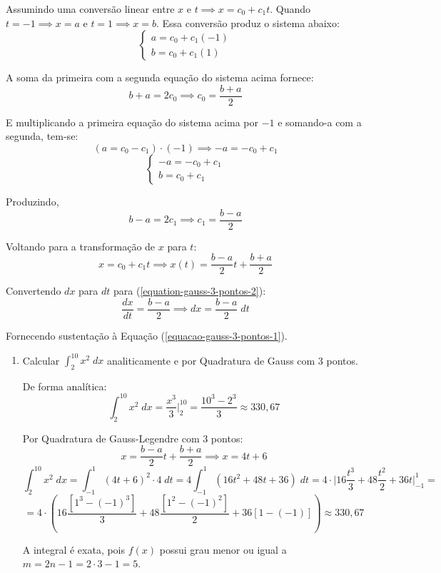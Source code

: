 Assumindo uma conversão linear entre $x$ e $t \implies x=c_0+c_1t$. Quando $t=-1\implies x=a$ e $t=1\implies x=b$. Essa conversão produz o sistema abaixo:
\[
\begin{cases}
	a=c_0+c_1(-1) \\
	b=c_0+c_1(1)
\end{cases}
\]

A soma da primeira com a segunda equação do sistema acima fornece:
\[ b+a=2c_0 \implies c_0=\frac{b+a}{2} \]

E multiplicando a primeira equação do sistema acima por $-1$ e somando-a com a segunda, tem-se:
\[ (a=c_0-c_1) \cdot (-1) \implies -a=-c_0+c_1 \]
\[
\begin{cases}
	-a=-c_0+c_1 \\
	b=c_0+c_1
\end{cases}
\]

Produzindo, \[ b-a=2c_1 \implies c_1=\frac{b-a}{2} \]

Voltando para a transformação de $x$ para $t$:
\begin{equation}
\label{equation-gauss-3-pontos-2}
x=c_0+c_1t \implies x(t)=\frac{b-a}{2}t+\frac{b+a}{2}
\end{equation}

Convertendo $dx$ para $dt$ para (\ref{equation-gauss-3-pontos-2}):
\[ \frac{dx}{dt}=\frac{b-a}{2} \implies dx=\frac{b-a}{2}\;dt \]

Fornecendo sustentação à Equação (\ref{equacao-gauss-3-pontos-1}).

\begin{enumerate}
	\item Calcular $\displaystyle\int_2^{10}x^2\;dx$ analiticamente e por Quadratura de Gauss com 3 pontos.
		
		De forma analítica:
		\[ \int_2^{10}x^2\;dx=\frac{x^3}{3}\Bigg|_2^{10}=\frac{10^3-2^3}{3}\approx330,67 \]
		
		Por Quadratura de Gauss-Legendre com 3 pontos:
		\[ x=\frac{b-a}{2}t+\frac{b+a}{2} \implies x=4t+6 \]
		\[ \int_2^{10}x^2\;dx = \int_{-1}^1 (4t+6)^2\cdot 4\;dt=4\int_{-1}^1(16t^2+48t+36)\;dt=4\cdot\Bigg|16\frac{t^3}{3}+48\frac{t^2}{2}+36t\Bigg|_{-1}^1=\]
		\[ =4\cdot\left( 16\frac{[1^3-(-1)^3]}{3}+48\frac{[1^2-(-1)^2]}{2}+36[1-(-1)] \right)\approx330,67 \]
		
		A integral é exata, pois $f(x)$ possui grau menor ou igual a $m=2n-1=2\cdot3-1=5$.
	
\end{enumerate}